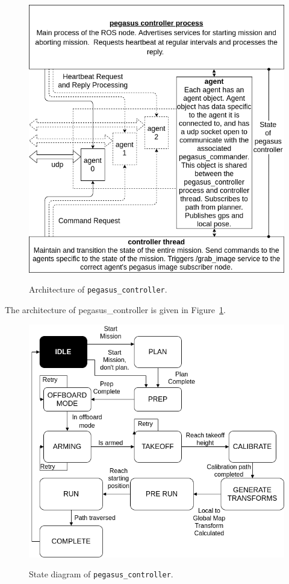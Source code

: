 \begin{figure}
	\centering
	\caption[Architecture of \texttt{pegasus\_controller}.]{\small Architecture of \texttt{pegasus\_controller}.}
	\includegraphics[width=5in]{figures/methodology/methodology-pegasus-controller}
	\label{fig:pegasus-controller}
\end{figure}

The architecture of pegasus\_controller is given in Figure~\ref{fig:pegasus-controller}.
\begin{figure}
	\centering
	\caption[State diagram of \texttt{pegasus\_controller}.]{\small State diagram of \texttt{pegasus\_controller}.}
	\includegraphics[width=5in]{figures/methodology/methodology-controller-state-diagram}
	\label{fig:controller-state-diagram}
\end{figure}

